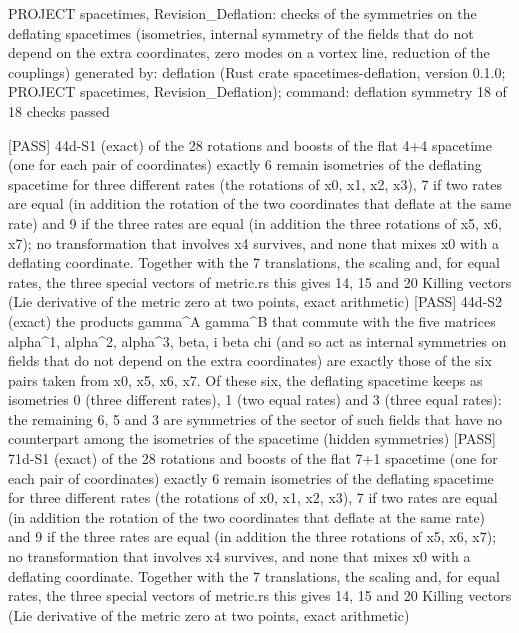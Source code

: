 \documentclass[
  10pt,
]{article}
\newenvironment{Shaded}{}{}
\newcommand{\NormalTok}[1]{#1}
\begin{document}
\begin{Shaded}
\begin{Highlighting}[]
\NormalTok{PROJECT spacetimes, Revision\_Deflation: checks of the symmetries on the deflating spacetimes (isometries, internal symmetry of the fields that do not depend on the extra coordinates, zero modes on a vortex line, reduction of the couplings)}
\NormalTok{generated by: deflation (Rust crate spacetimes{-}deflation, version 0.1.0; PROJECT spacetimes, Revision\_Deflation); command: deflation symmetry}
\NormalTok{18 of 18 checks passed}

\NormalTok{[PASS] 44d{-}S1  (exact) of the 28 rotations and boosts of the flat 4+4 spacetime (one for each pair of coordinates) exactly 6 remain isometries of the deflating spacetime for three different rates (the rotations of x0, x1, x2, x3), 7 if two rates are equal (in addition the rotation of the two coordinates that deflate at the same rate) and 9 if the three rates are equal (in addition the three rotations of x5, x6, x7); no transformation that involves x4 survives, and none that mixes x0 with a deflating coordinate. Together with the 7 translations, the scaling and, for equal rates, the three special vectors of metric.rs this gives 14, 15 and 20 Killing vectors (Lie derivative of the metric zero at two points, exact arithmetic)}
\NormalTok{[PASS] 44d{-}S2  (exact) the products gamma\^{}A gamma\^{}B that commute with the five matrices alpha\^{}1, alpha\^{}2, alpha\^{}3, beta, i beta chi (and so act as internal symmetries on fields that do not depend on the extra coordinates) are exactly those of the six pairs taken from x0, x5, x6, x7. Of these six, the deflating spacetime keeps as isometries 0 (three different rates), 1 (two equal rates) and 3 (three equal rates): the remaining 6, 5 and 3 are symmetries of the sector of such fields that have no counterpart among the isometries of the spacetime (hidden symmetries)}
\NormalTok{[PASS] 71d{-}S1  (exact) of the 28 rotations and boosts of the flat 7+1 spacetime (one for each pair of coordinates) exactly 6 remain isometries of the deflating spacetime for three different rates (the rotations of x0, x1, x2, x3), 7 if two rates are equal (in addition the rotation of the two coordinates that deflate at the same rate) and 9 if the three rates are equal (in addition the three rotations of x5, x6, x7); no transformation that involves x4 survives, and none that mixes x0 with a deflating coordinate. Together with the 7 translations, the scaling and, for equal rates, the three special vectors of metric.rs this gives 14, 15 and 20 Killing vectors (Lie derivative of the metric zero at two points, exact arithmetic)}

\end{Highlighting}
\end{Shaded}
\end{document}
